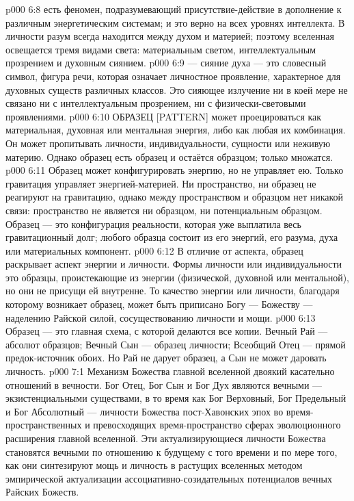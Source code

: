 \vs p000 6:8 \pc {} есть феномен, подразумевающий присутствие\hyp{}действие  в дополнение к различным энергетическим системам; и это верно на всех уровнях интеллекта. В личности разум всегда находится между духом и материей; поэтому вселенная освещается тремя видами света: материальным светом, интеллектуальным прозрением и духовным сиянием.
\vs p000 6:9 \pc {} --- сияние духа --- это словесный символ, фигура речи, которая означает личностное проявление, характерное для духовных существ различных классов. Это сияющее излучение ни в коей мере не связано ни с интеллектуальным прозрением, ни с физически\hyp{}световыми проявлениями.
\vs p000 6:10 \pc ОБРАЗЕЦ [PATTERN] может проецироваться как материальная, духовная или ментальная энергия, либо как любая их комбинация. Он может пропитывать личности, индивидуальности, сущности или неживую материю. Однако образец есть образец и остаётся образцом; только  множатся.
\vs p000 6:11 Образец может конфигурировать энергию, но не управляет ею. Только гравитация управляет энергией\hyp{}материей. Ни пространство, ни образец не реагируют на гравитацию, однако между пространством и образцом нет никакой связи: пространство не является ни образцом, ни потенциальным образцом. Образец --- это конфигурация реальности, которая уже выплатила весь гравитационный долг;  любого образца состоит из его энергий, его разума, духа или материальных компонент.
\vs p000 6:12 В отличие от  аспекта, образец раскрывает  аспект энергии и личности. Формы личности или индивидуальности это образцы, проистекающие из энергии (физической, духовной или ментальной), но они не присущи ей внутренне. То качество энергии или личности, благодаря которому возникает образец, может быть приписано Богу --- Божеству --- наделению Райской силой, сосуществованию личности и мощи.
\vs p000 6:13 Образец --- это главная схема, с которой делаются все копии. Вечный Рай --- абсолют образцов; Вечный Сын --- образец личности; Всеобщий Отец --- прямой предок\hyp{}источник обоих. Но Рай не дарует образец, а Сын не может даровать личность.
\vs p000 7:1 Механизм Божества главной вселенной двоякий касательно отношений в вечности. Бог Отец, Бог Сын и Бог Дух являются вечными --- экзистенциальными существами, в то время как Бог Верховный, Бог Предельный и Бог Абсолютный ---  личности Божества пост\hyp{}Хавонских эпох во время\hyp{}пространственных и превосходящих время\hyp{}пространство сферах эволюционного расширения главной вселенной. Эти актуализирующиеся личности Божества становятся вечными по отношению к будущему с того времени и по мере того, как они синтезируют мощь и личность в растущих вселенных методом эмпирической актуализации ассоциативно\hyp{}созидательных потенциалов вечных Райских Божеств.
